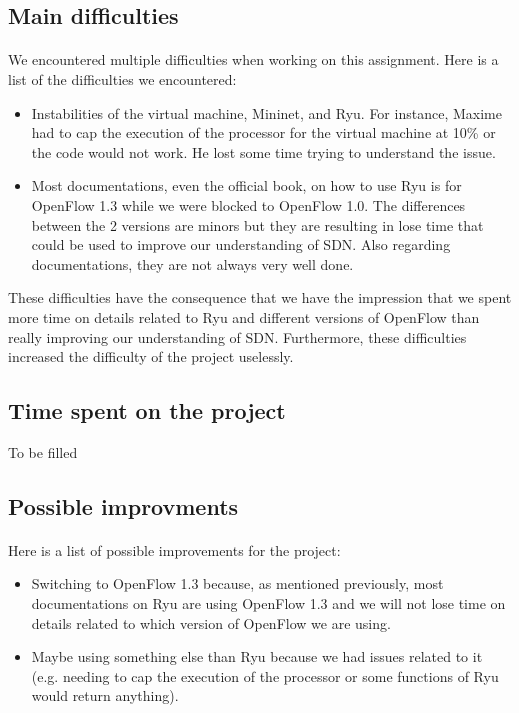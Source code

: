 \documentclass[a4paper, 11pt, oneside]{article}
\begin{document}
\subsection{Main difficulties}
\paragraph{}We encountered multiple difficulties when working on this assignment. Here is a list of the difficulties we encountered:
\begin{itemize}
\item Instabilities of the virtual machine, Mininet, and Ryu. For instance, Maxime had to cap the execution of the processor for the virtual machine at 10\% or the code would not work. He lost some time trying to understand the issue.
\item Most documentations, even the official book, on how to use Ryu is for OpenFlow 1.3 while we were blocked to OpenFlow 1.0. The differences between the 2 versions are minors but they are resulting in lose time that could be used to improve our understanding of SDN. Also regarding documentations, they are not always very well done.
\end{itemize}
These difficulties have the consequence that we have the impression that we spent more time on details related to Ryu and different versions of OpenFlow than really improving our understanding of SDN. Furthermore, these difficulties increased the difficulty of the project uselessly.

\subsection{Time spent on the project}
To be filled

\subsection{Possible improvments}
\paragraph{}Here is a list of possible improvements for the project:
\begin{itemize}
\item Switching to OpenFlow 1.3 because, as mentioned previously, most documentations on Ryu are using OpenFlow 1.3 and we will not lose time on details related to which version of OpenFlow we are using.
\item Maybe using something else than Ryu because we had issues related to it (e.g. needing to cap the execution of the processor or some functions of Ryu would return anything).
\end{itemize}

\end{document}
